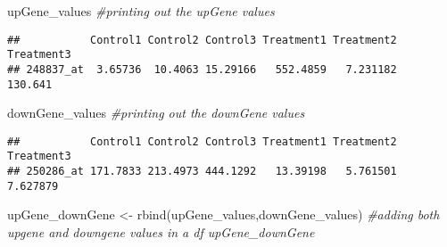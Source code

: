 \documentclass[
]{article}
\newenvironment{Shaded}{\begin{snugshade}}{\end{snugshade}}
\newcommand{\CommentTok}[1]{\textcolor[rgb]{0.56,0.35,0.01}{\textit{#1}}}
\newcommand{\FunctionTok}[1]{\textcolor[rgb]{0.00,0.00,0.00}{#1}}
\newcommand{\NormalTok}[1]{#1}
\newcommand{\OtherTok}[1]{\textcolor[rgb]{0.56,0.35,0.01}{#1}}
\newcommand{\SpecialCharTok}[1]{\textcolor[rgb]{0.00,0.00,0.00}{#1}}
\begin{document}
\begin{Shaded}
\end{Shaded}

\begin{Shaded}
\begin{Highlighting}[]
\NormalTok{upGene\_values }\CommentTok{\#printing out the upGene values}
\end{Highlighting}
\end{Shaded}

\begin{verbatim}
##           Control1 Control2 Control3 Treatment1 Treatment2 Treatment3
## 248837_at  3.65736  10.4063 15.29166   552.4859   7.231182    130.641
\end{verbatim}

\begin{Shaded}
\begin{Highlighting}[]
\NormalTok{downGene\_values }\CommentTok{\#printing out the downGene values}
\end{Highlighting}
\end{Shaded}

\begin{verbatim}
##           Control1 Control2 Control3 Treatment1 Treatment2 Treatment3
## 250286_at 171.7833 213.4973 444.1292   13.39198   5.761501   7.627879
\end{verbatim}

\begin{Shaded}
\begin{Highlighting}[]
\NormalTok{upGene\_downGene }\OtherTok{\textless{}{-}} \FunctionTok{rbind}\NormalTok{(upGene\_values,downGene\_values) }\CommentTok{\#adding both upgene and downgene values in a df upGene\_downGene}
\end{Highlighting}
\end{Shaded}
\end{document}
